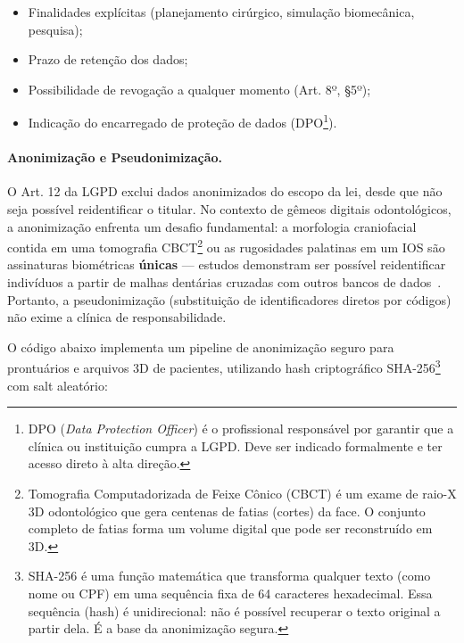 \begin{itemize}
    \item Finalidades explícitas (planejamento cirúrgico, simulação biomecânica, pesquisa);
    \item Prazo de retenção dos dados;
    \item Possibilidade de revogação a qualquer momento (Art. 8º, §5º);
    \item Indicação do encarregado de proteção de dados (DPO\footnote[3]{DPO (\textit{Data Protection Officer}) é o profissional responsável por garantir que a clínica ou instituição cumpra a LGPD. Deve ser indicado formalmente e ter acesso direto à alta direção.}).
\end{itemize}

\paragraph{Anonimização e Pseudonimização.}
O Art. 12 da LGPD exclui dados anonimizados do escopo da lei, desde que não seja possível reidentificar o titular. No contexto de gêmeos digitais odontológicos, a anonimização enfrenta um desafio fundamental: a morfologia craniofacial contida em uma tomografia CBCT\footnote[4]{Tomografia Computadorizada de Feixe Cônico (CBCT) é um exame de raio-X 3D odontológico que gera centenas de fatias (cortes) da face. O conjunto completo de fatias forma um volume digital que pode ser reconstruído em 3D.} ou as rugosidades palatinas em um IOS são assinaturas biométricas \textbf{únicas} — estudos demonstram ser possível reidentificar indivíduos a partir de malhas dentárias cruzadas com outros bancos de dados~\cite{springer2026realising}. Portanto, a pseudonimização (substituição de identificadores diretos por códigos) não exime a clínica de responsabilidade.

O código abaixo implementa um pipeline de anonimização seguro para prontuários e arquivos 3D de pacientes, utilizando hash criptográfico SHA-256\footnote[5]{SHA-256 é uma função matemática que transforma qualquer texto (como nome ou CPF) em uma sequência fixa de 64 caracteres hexadecimal. Essa sequência (hash) é unidirecional: não é possível recuperar o texto original a partir dela. É a base da anonimização segura.} com salt aleatório:

